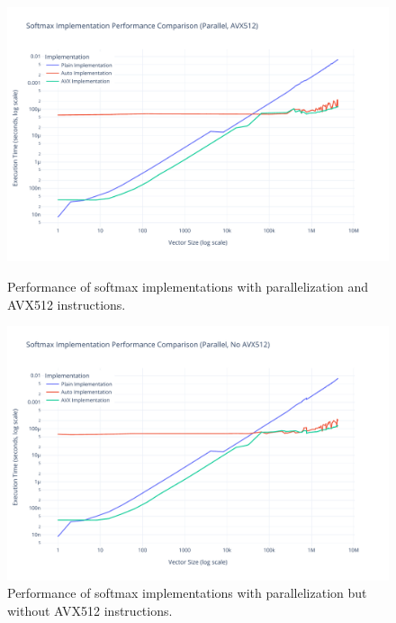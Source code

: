 \documentclass[10pt]{article}
\begin{document}
\begin{figure}[H]
  \centering
  \begin{minipage}{0.48\textwidth}
    \centering
    \includegraphics[width=\textwidth]{../images/performance/softmax_parallel_avx512.pdf}
    \caption{Performance of softmax implementations with parallelization and AVX512 instructions.}
    \label{fig:perf_parallel_avx512}
  \end{minipage}
  \hfill
  \begin{minipage}{0.48\textwidth}
    \centering
    \includegraphics[width=\textwidth]{../images/performance/softmax_parallel_noavx512.pdf}
    \caption{Performance of softmax implementations with parallelization but without AVX512 instructions.}
    \label{fig:perf_parallel_noavx512}
  \end{minipage}
\end{figure}
\end{document}
